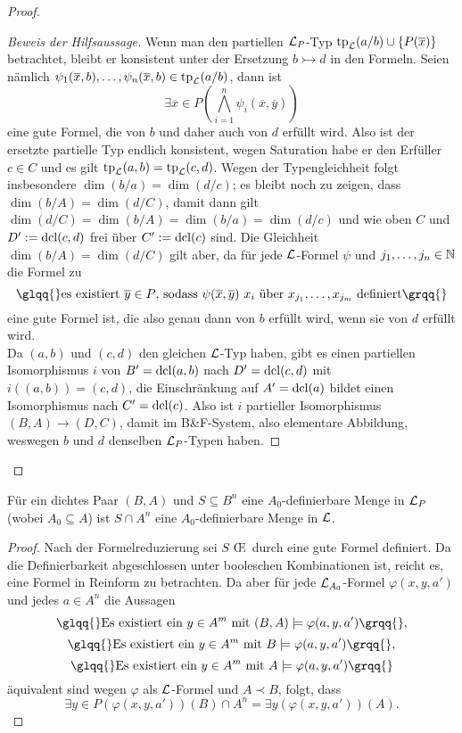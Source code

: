 \begin{proof}
\begin{proof}[Beweis der Hilfsaussage]
		Wenn man den partiellen $\mathcal{L}_P$-Typ $\operatorname{tp}_{\mathcal{L}}(a/b)\cup\{P(\overline{x})\}$ betrachtet, bleibt er konsistent unter der Ersetzung $b\rightarrowtail d$ in den Formeln. Seien nämlich $\psi_1(\overline{x},b),\dots,\psi_n(\overline{x},b)\in\operatorname{tp}_{\mathcal{L}}(a/b)$, dann ist $$\exists\overline{x}\in P(\bigwedge\limits_{i=1}^n\psi_i(\overline{x},\overline{y}))$$ eine gute Formel, die von $b$ und daher auch von $d$ erfüllt wird. Also ist der ersetzte partielle Typ endlich konsistent, wegen Saturation habe er den Erfüller $c\in C$ und es gilt $\operatorname{tp}_{\mathcal{L}}(a,b)=\operatorname{tp}_{\mathcal{L}}(c,d)$. Wegen der Typengleichheit folgt insbesondere $\dim(b/a)=\dim(d/c)$; es bleibt noch zu zeigen, dass $\dim(b/A)=\dim(d/C)$, damit dann gilt $\dim(d/C)=\dim(b/A)=\dim(b/a)=\dim(d/c)$ und wie oben $C$ und $D':=\operatorname{dcl}(c,d)$ frei über $C':=\operatorname{dcl}(c)$ sind. Die Gleichheit $\dim(b/A)=\dim(d/C)$ gilt aber, da für jede $\mathcal{L}$-Formel $\psi$ und $j_1,\dots,j_n\in\mathbb{N}$ die Formel zu $$\glqq{}\text{es existiert }\overline{y}\in P\text{, sodass }\psi(\overline{x},\overline{y})\ x_i\text{ über }x_{j_1},\dots,x_{j_m}\text{ definiert}\grqq{}$$ eine gute Formel ist, die also genau dann von $b$ erfüllt wird, wenn sie von $d$ erfüllt wird.\\
		Da $(a,b)$ und $(c,d)$ den gleichen $\mathcal{L}$-Typ haben, gibt es einen partiellen Isomorphismus $i$ von $B'=\operatorname{dcl}(a,b)$ nach $D'=\operatorname{dcl}(c,d)$ mit $i((a,b))=(c,d)$, die Einschränkung auf $A'=\operatorname{dcl}(a)$ bildet einen Isomorphismus nach $C'=\operatorname{dcl}(c)$. Also ist $i$ partieller Isomorphismus $(B,A)\rightarrow(D,C)$, damit im B\&F-System, also elementare Abbildung, weswegen $b$ und $d$ denselben $\mathcal{L}_P$-Typen haben.
	\end{proof}
\end{proof}

\begin{corollary}\label{Definierbarkeit aus A}
	Für ein dichtes Paar $(B,A)$ und $S\subseteq B^n$ eine $A_0$-definierbare Menge in $\mathcal{L}_P$ (wobei $A_0\subseteq A$) ist $S\cap A^n$ eine $A_0$-definierbare Menge in $\mathcal{L}$.
\end{corollary}
\begin{proof}
	Nach der Formelreduzierung sei $S$ \OE\ durch eine gute Formel definiert. Da die Definierbarkeit abgeschlossen unter booleschen Kombinationen ist, reicht es, eine Formel in Reinform zu betrachten.\newpage
	Da aber für jede $\mathcal{L}_{A_0}$-Formel $\varphi(x,y,a')$ und jedes $a\in A^n$ die Aussagen $$\glqq{}\text{Es existiert ein }y\in A^m\text{ mit }(B,A)\models\varphi(a,y,a')\grqq{},$$ $$\glqq{}\text{Es existiert ein }y\in A^m\text{ mit }B\models\varphi(a,y,a')\grqq{},$$ $$\glqq{}\text{Es existiert ein }y\in A^m\text{ mit }A\models\varphi(a,y,a')\grqq{}$$ äquivalent sind wegen $\varphi$ als $\mathcal{L}$-Formel und $A\prec B$, folgt, dass $$\exists y\in P(\varphi(x,y,a'))(B)\cap A^n=\exists y(\varphi(x,y,a'))(A).$$
\end{proof}

